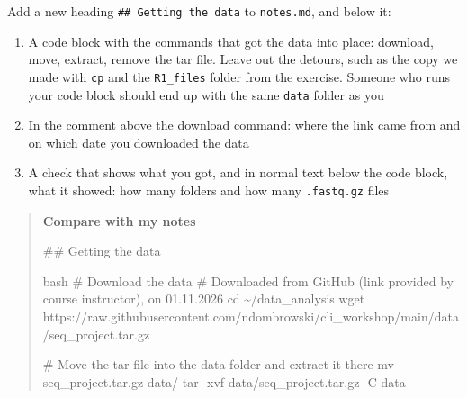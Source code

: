 \documentclass[
  letterpaper,
  DIV=11,
  numbers=noendperiod]{scrreprt}
\newenvironment{Shaded}{}{}
\newcommand{\AttributeTok}[1]{\textcolor[rgb]{0.84,0.23,0.29}{#1}}
\newcommand{\BuiltInTok}[1]{\textcolor[rgb]{0.84,0.23,0.29}{#1}}
\newcommand{\CommentTok}[1]{\textcolor[rgb]{0.42,0.45,0.49}{#1}}
\newcommand{\FunctionTok}[1]{\textcolor[rgb]{0.44,0.26,0.76}{#1}}
\newcommand{\InformationTok}[1]{\textcolor[rgb]{0.42,0.45,0.49}{#1}}
\newcommand{\NormalTok}[1]{\textcolor[rgb]{0.14,0.16,0.18}{#1}}
\providecommand{\tightlist}{%
  \setlength{\itemsep}{0pt}\setlength{\parskip}{0pt}}
\begin{document}
\begin{tcolorbox}[enhanced jigsaw, coltitle=black, breakable, titlerule=0mm, colback=white, rightrule=.15mm, bottomrule=.15mm, toprule=.15mm, colframe=quarto-callout-color-frame, colbacktitle=quarto-callout-color!10!white, bottomtitle=1mm, opacitybacktitle=0.6, toptitle=1mm, leftrule=.75mm, arc=.35mm, title=\textcolor{quarto-callout-color}{\faInfo}\hspace{0.5em}{Notebook checkpoint: Getting the data}, left=2mm, opacityback=0]

Add a new heading \texttt{\#\#\ Getting\ the\ data} to
\texttt{notes.md}, and below it:

\begin{enumerate}
\def\labelenumi{\arabic{enumi}.}
\tightlist
\item
  A code block with the commands that got the data into place: download,
  move, extract, remove the tar file. Leave out the detours, such as the
  copy we made with \texttt{cp} and the \texttt{R1\_files} folder from
  the exercise. Someone who runs your code block should end up with the
  same \texttt{data} folder as you
\item
  In the comment above the download command: where the link came from
  and on which date you downloaded the data
\item
  A check that shows what you got, and in normal text below the code
  block, what it showed: how many folders and how many
  \texttt{.fastq.gz} files
\end{enumerate}

\begin{quote}
\textbf{Compare with my notes}

\begin{Shaded}
\begin{Highlighting}[]
\FunctionTok{\#\# Getting the data}

\InformationTok{\textasciigrave{}\textasciigrave{}\textasciigrave{}bash}
\CommentTok{\# Download the data}
\CommentTok{\# Downloaded from GitHub (link provided by course instructor), on 01.11.2026}
\BuiltInTok{cd}\NormalTok{ \textasciitilde{}/data\_analysis}
\FunctionTok{wget}\NormalTok{ https://raw.githubusercontent.com/ndombrowski/cli\_workshop/main/data/seq\_project.tar.gz}

\CommentTok{\# Move the tar file into the data folder and extract it there}
\FunctionTok{mv}\NormalTok{ seq\_project.tar.gz data/}
\FunctionTok{tar} \AttributeTok{{-}xvf}\NormalTok{ data/seq\_project.tar.gz }\AttributeTok{{-}C}\NormalTok{ data}


\end{Highlighting}
\end{Shaded}
\end{quote}
\end{tcolorbox}
\end{document}
